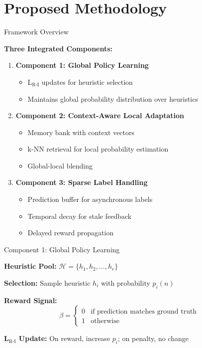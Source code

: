 \documentclass[10pt,xcolor={table,dvipsnames},t]{beamer}
\begin{document}
\section{Proposed Methodology}

\begin{frame}{Framework Overview}

\textbf{Three Integrated Components:}

\begin{enumerate}
  \item \textbf{Component 1: Global Policy Learning}
  \begin{itemize}
    \item L$_{\text{R-I}}$ updates for heuristic selection
    \item Maintains global probability distribution over heuristics
  \end{itemize}

  \item \textbf{Component 2: Context-Aware Local Adaptation}
  \begin{itemize}
    \item Memory bank with context vectors
    \item k-NN retrieval for local probability estimation
    \item Global-local blending
  \end{itemize}

  \item \textbf{Component 3: Sparse Label Handling}
  \begin{itemize}
    \item Prediction buffer for asynchronous labels
    \item Temporal decay for stale feedback
    \item Delayed reward propagation
  \end{itemize}
\end{enumerate}

\end{frame}

\begin{frame}{Component 1: Global Policy Learning}

\textbf{Heuristic Pool:} $\mathcal{H} = \{h_1, h_2, \ldots, h_r\}$

\textbf{Selection:} Sample heuristic $h_i$ with probability $p_i(n)$

\textbf{Reward Signal:}
\begin{equation}
\beta = \begin{cases}
0 & \text{if prediction matches ground truth} \\
1 & \text{otherwise}
\end{cases}
\end{equation}

\textbf{L$_{\text{R-I}}$ Update:} On reward, increase $p_i$; on penalty, no change

\end{frame}
\end{document}
